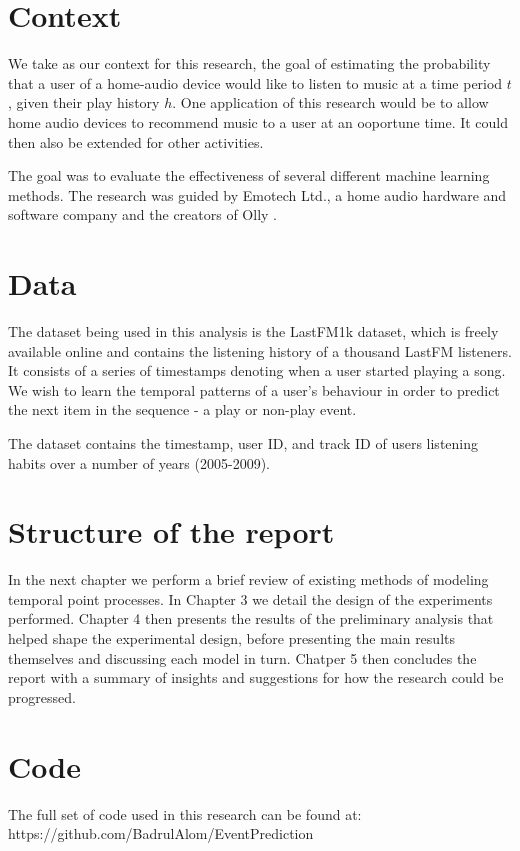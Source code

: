 \section{Context}

We take as our context for this research, the goal of estimating the probability that a user of a home-audio device would like to listen to music at a time period $t$, given their play history $h$. One application of this research would be to allow home audio devices to recommend music to a user at an ooportune time. It could then also be extended for other activities.

The goal was to evaluate the effectiveness of several different machine learning methods. The research was guided by Emotech Ltd., a home audio hardware and software company and the creators of Olly \parencite{Olly}.

\section{Data}

The dataset being used in this analysis is the LastFM1k dataset, which is freely available online and contains the listening history of a thousand LastFM listeners. It consists of a series of timestamps denoting when a user started playing a song. We wish to learn the temporal patterns of a user's behaviour in order to predict the next item in the sequence - a play or non-play event. 

The dataset contains the timestamp, user ID, and track ID of users listening habits over a number of years (2005-2009).

\section{Structure of the report}

In the next chapter we perform a brief review of existing methods of modeling temporal point processes. In Chapter 3 we detail the design of the experiments performed. Chapter 4 then presents the results of the preliminary analysis that helped shape the experimental design, before presenting the main results themselves and discussing each model in turn. Chatper 5 then concludes the report with a summary of insights and suggestions for how the research could be progressed.

\section{Code}

The full set of code used in this research can be found at:
\newline
https://github.com/BadrulAlom/EventPrediction